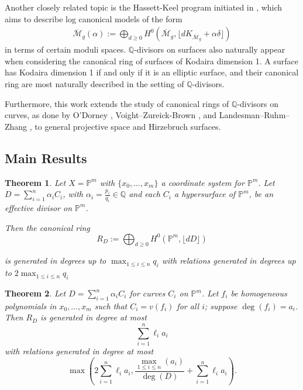 \documentclass{amsart}
\theoremstyle{plain}
\newtheorem{thm}{Theorem}[section]
\theoremstyle{definition}
\theoremstyle{remark}
\numberwithin{equation}{section}
\newcommand\ssec{\subsection}
\newcommand\bq{{\mathbb Q}}
\newcommand\bp{{\mathbb P}}
\newcommand\bida{a}
\begin{document}
Another closely related topic is the Hassett-Keel program 
initiated in  \cite{hassett:classical-and-minimal-models}, which aims to describe log canonical models of the form
\begin{align*}
	\overline {\mathscr M}_g(\alpha) := \bigoplus_{d \geq 0}H^0 \left( \overline {\mathscr M}_g, \lfloor d K_{\overline{\mathscr M}_g} + \alpha\delta \rfloor  \right) 
\end{align*}
in terms of certain moduli spaces. $\bq$-divisors on surfaces also naturally appear when considering the canonical ring of surfaces of Kodaira dimension 1. A surface has Kodaira dimension 1 if and only if it is an elliptic surface, and their canonical ring are most naturally described in the setting of $\bq$-divisors. 

Furthermore, this work extends the study of canonical rings of
$\bq$-divisors on curves, as done by O'Dorney \cite{dorney:canonical},
Voight--Zureick-Brown \cite{vzb:stacky}, and Landesman--Ruhm--Zhang
\cite{lrz:spin-cring}, to general projective space and Hirzebruch
surfaces.


\ssec{Main Results}


\begin{thm}
\label{thm:proj-effective-intro}
Let $X = \bp^m$ with $\{x_0, \ldots, x_m\}$ a coordinate system for
$\bp^m$. Let $D = \sum_{i = 1}^{n} \alpha_i C_i$, with $\alpha_i =
\frac{p_i}{q_i} \in \bq$ and each $C_i$ a hypersurface of
$\bp^m$, be an effective divisor on $\bp^m$.

Then the canonical ring
\[
	R_D := \bigoplus_{d \geq 0} H^0(\bp^m, \lfloor dD \rfloor)
\]

\noindent
is generated in degrees up to $\max_{1 \leq i \leq n}{q_i}$ with
relations generated in degrees up to $2 \max_{1 \leq i \leq n}{q_i}$
\end{thm}


\begin{thm}
\label{proj-generators-relations-intro}
Let $D = \sum_{i=1}^n \alpha_i C_i$ for curves $C_i$ on $\mathbb{P}^m$.  Let $f_i$ be homogeneous polynomials in $x_0, \ldots, x_m$ such that $C_i = v(f_i)$ for all $i$; suppose $\deg(f_i) = a_i$. 
Then $R_D$ is generated in degree at most 
\[
	\sum_{i=1}^n \ell_i a_i
\]
with relations generated in degree at most
\[
	\max \left(2 \sum_{i=1}^n \ell_i a_i, \frac{\max_{1\le i \le n}(\bida_i)}{\deg(D)} + \sum_{i=1}^n \ell_i a_i \right).
\]
\end{thm}
\end{document}
